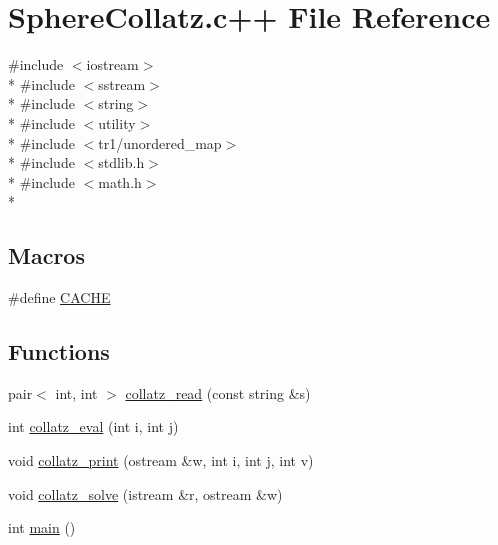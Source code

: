 \hypertarget{SphereCollatz_8c_09_09}{\section{Sphere\-Collatz.\-c++ File Reference}
\label{SphereCollatz_8c_09_09}
}
{\ttfamily \#include $<$iostream$>$}\\*
{\ttfamily \#include $<$sstream$>$}\\*
{\ttfamily \#include $<$string$>$}\\*
{\ttfamily \#include $<$utility$>$}\\*
{\ttfamily \#include $<$tr1/unordered\-\_\-map$>$}\\*
{\ttfamily \#include $<$stdlib.\-h$>$}\\*
{\ttfamily \#include $<$math.\-h$>$}\\*
\subsection*{Macros}
\begin{DoxyCompactItemize}
\item 
\#define \hyperlink{SphereCollatz_8c_09_09_a43fd55aa78bd891ebbd6a450f5eecce4}{C\-A\-C\-H\-E}
\end{DoxyCompactItemize}
\subsection*{Functions}
\begin{DoxyCompactItemize}
\item 
pair$<$ int, int $>$ \hyperlink{SphereCollatz_8c_09_09_a2772f8a734aeab48332eb3b282f991ba}{collatz\-\_\-read} (const string \&s)
\item 
int \hyperlink{SphereCollatz_8c_09_09_a0b0d3827a619c18aa4d96b8ee8b1c47d}{collatz\-\_\-eval} (int i, int j)
\item 
void \hyperlink{SphereCollatz_8c_09_09_aeda0b7ea3e40e1e7487ccc436f33a559}{collatz\-\_\-print} (ostream \&w, int i, int j, int v)
\item 
void \hyperlink{SphereCollatz_8c_09_09_a0ac646d2122741f9a9a52201bf9551cc}{collatz\-\_\-solve} (istream \&r, ostream \&w)
\item 
int \hyperlink{SphereCollatz_8c_09_09_ae66f6b31b5ad750f1fe042a706a4e3d4}{main} ()
\end{DoxyCompactItemize}
